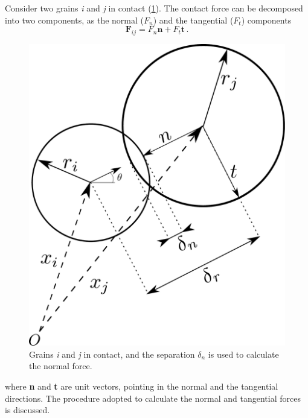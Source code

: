Consider two grains \textit{i} and \textit{j} in contact 
(\cref{fig:DEM}). The contact force can be decomposed into two components, 
as the normal ($\mathit{F}_{n}$) and the tangential ($\mathit{F}_{t}$) 
components
%
\begin{equation}
 \mathbf{F}_{ij}=F_{n}\mathbf{n}+F_{t}\mathbf{t} \,.
\label{eq:fnt}
\end{equation}

\begin{figure}[htbp]
	\centering
	\includegraphics[width=0.7\linewidth]{DEM}
	\caption[Calculation of normal force in DEM.]{Grains \textit{i} and 
	\textit{j} in 
	contact, and the 
	separation $\delta_{n}$ is used to calculate the normal force.} 
	\label{fig:DEM}
\end{figure}

where \textbf{n} and \textbf{t} are unit vectors, pointing in the normal and 
the tangential directions. The procedure adopted to calculate the normal and 
tangential forces is discussed.

